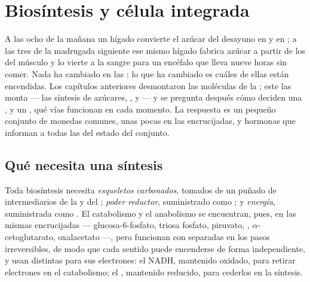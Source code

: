 \chapter{Biosíntesis y célula integrada}\label{ch:b1:biosyntheses-integration}

A las ocho de la mañana un hígado convierte el azúcar del desayuno en
 y en ; a las tres de la madrugada siguiente ese mismo hígado
fabrica azúcar a partir de los  del músculo y lo vierte a la
sangre para un encéfalo que lleva nueve horas sin comer. Nada ha cambiado en
las ; lo que ha cambiado es cuáles de ellas están encendidas. Los
capítulos anteriores desmontaron las moléculas de la ; este las monta
--- las síntesis de azúcares, ,  y  --- y se
pregunta después cómo deciden una , y un , qué vías funcionan
en cada momento. La respuesta es un pequeño conjunto de monedas comunes,
unas pocas  en las encrucijadas, y hormonas que informan a todas las
 del estado del conjunto.

\section{Qué necesita una síntesis}

\begin{proposition}\label{prop:b1:biosyntheses-integration:needs}
Toda biosíntesis necesita \emph{esqueletos carbonados}, tomados de un puñado
de intermediarios de la  y del ; \emph{poder
reductor}, suministrado como ; y \emph{energía}, suministrada como .
El catabolismo y el anabolismo se encuentran, pues, en las mismas
encrucijadas --- glucosa-6-fosfato, triosa fosfato, piruvato, ,
$\alpha$-cetoglutarato, oxalacetato ---, pero funcionan con 
separadas en los pasos irreversibles, de modo que cada sentido puede
encenderse de forma independiente, y usan  distintas para sus
electrones: el NADH, mantenido oxidado, para retirar electrones en el
catabolismo; el , mantenido reducido, para cederlos en la síntesis.
\end{proposition}

